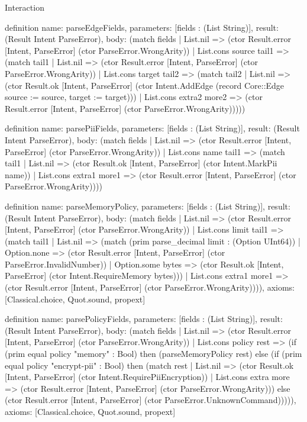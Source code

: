 \begin{lexlean}{Interaction}
\begin{semanticmodule}
definition{
  name: parseEdgeFields,
  parameters: [fields : (List String)],
  result: (Result Intent ParseError),
  body: (match fields
    | List.nil => (ctor Result.error [Intent, ParseError] (ctor ParseError.WrongArity))
    | List.cons source tail1 => (match tail1
      | List.nil => (ctor Result.error [Intent, ParseError] (ctor ParseError.WrongArity))
      | List.cons target tail2 => (match tail2
        | List.nil => (ctor Result.ok [Intent, ParseError] (ctor Intent.AddEdge (record Core::Edge {source := source, target := target})))
        | List.cons extra2 more2 => (ctor Result.error [Intent, ParseError] (ctor ParseError.WrongArity)))))
}

definition{
  name: parsePiiFields,
  parameters: [fields : (List String)],
  result: (Result Intent ParseError),
  body: (match fields
    | List.nil => (ctor Result.error [Intent, ParseError] (ctor ParseError.WrongArity))
    | List.cons name tail1 => (match tail1
      | List.nil => (ctor Result.ok [Intent, ParseError] (ctor Intent.MarkPii name))
      | List.cons extra1 more1 => (ctor Result.error [Intent, ParseError] (ctor ParseError.WrongArity))))
}

definition{
  name: parseMemoryPolicy,
  parameters: [fields : (List String)],
  result: (Result Intent ParseError),
  body: (match fields
    | List.nil => (ctor Result.error [Intent, ParseError] (ctor ParseError.WrongArity))
    | List.cons limit tail1 => (match tail1
      | List.nil => (match (prim parse_decimal limit : (Option UInt64))
        | Option.none => (ctor Result.error [Intent, ParseError] (ctor ParseError.InvalidNumber))
        | Option.some bytes => (ctor Result.ok [Intent, ParseError] (ctor Intent.RequireMemory bytes)))
      | List.cons extra1 more1 => (ctor Result.error [Intent, ParseError] (ctor ParseError.WrongArity)))),
  axioms: [Classical.choice, Quot.sound, propext]
}

definition{
  name: parsePolicyFields,
  parameters: [fields : (List String)],
  result: (Result Intent ParseError),
  body: (match fields
    | List.nil => (ctor Result.error [Intent, ParseError] (ctor ParseError.WrongArity))
    | List.cons policy rest => (if (prim equal policy "memory" : Bool) then (parseMemoryPolicy rest) else (if (prim equal policy "encrypt-pii" : Bool) then (match rest
      | List.nil => (ctor Result.ok [Intent, ParseError] (ctor Intent.RequirePiiEncryption))
      | List.cons extra more => (ctor Result.error [Intent, ParseError] (ctor ParseError.WrongArity))) else (ctor Result.error [Intent, ParseError] (ctor ParseError.UnknownCommand))))),
  axioms: [Classical.choice, Quot.sound, propext]
}


\end{semanticmodule}
\end{lexlean}

